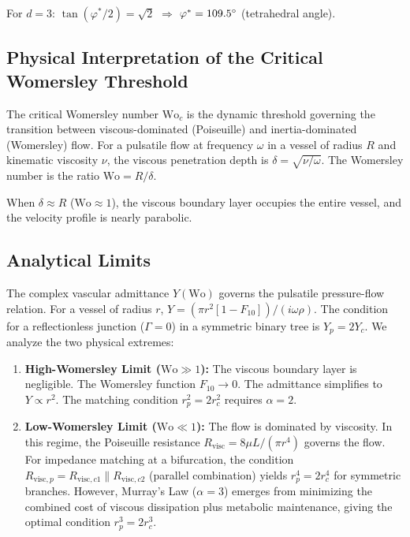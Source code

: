 \documentclass[11pt,a4paper]{article}
\theoremstyle{remark}
\begin{document}
For $d=3$: $\tan(\varphi^*/2) = \sqrt{2}$ $\Rightarrow$ $\varphi^* =
109.5^\circ$ (tetrahedral angle).

\subsection{Physical Interpretation of the Critical Womersley Threshold}
The critical Womersley number $\mathrm{Wo}_c$ is the dynamic threshold governing
the transition between viscous-dominated (Poiseuille) and inertia-dominated
(Womersley) flow. For a pulsatile flow at frequency $\omega$ in a vessel of
radius $R$ and kinematic viscosity $\nu$, the viscous penetration depth is
$\delta = \sqrt{\nu/\omega}$. The Womersley number is the ratio $\mathrm{Wo} =
R/\delta$.

When $\delta \approx R$ ($\mathrm{Wo} \approx 1$), the viscous boundary layer
occupies the entire vessel, and the velocity profile is nearly parabolic.

\subsection{Analytical Limits}
The complex vascular admittance $Y(\mathrm{Wo})$ governs the pulsatile
pressure-flow relation. For a vessel of radius $r$, $Y = (\pi r^2 [1-F_{10}]) /
(i\omega\rho)$. The condition for a reflectionless junction ($\Gamma = 0$) in a
symmetric binary tree is $Y_p = 2 Y_c$. We analyze the two physical extremes:
\begin{enumerate}
    \item
\textbf{High-Womersley Limit ($\mathrm{Wo} \gg 1$):} The viscous boundary layer
is negligible. The Womersley function $F_{10} \to 0$. The admittance simplifies
to $Y \propto r^2$. The matching condition $r_p^2 = 2 r_c^2$ requires $\alpha =
2$.
    \item
\textbf{Low-Womersley Limit ($\mathrm{Wo} \ll 1$):} The flow is dominated by
viscosity. In this regime, the Poiseuille resistance $R_{\mathrm{visc}} = 8\mu
L/(\pi r^4)$ governs the flow. For impedance matching at a bifurcation, the
condition $R_{\mathrm{visc},p} = R_{\mathrm{visc},c1} \parallel
R_{\mathrm{visc},c2}$ (parallel combination) yields $r_p^4 = 2 r_c^4$ for
symmetric branches. However, Murray's Law ($\alpha = 3$) emerges from minimizing
the combined cost of viscous dissipation plus metabolic maintenance, giving the
optimal condition $r_p^3 = 2 r_c^3$.
\end{enumerate}
\end{document}
